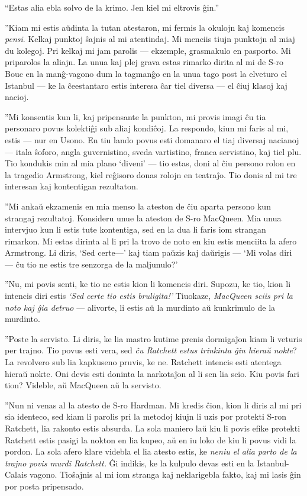 ``Estas alia ebla solvo de la krimo. Jen kiel mi eltrovis ĝin.''

''Kiam mi estis aŭdinta la tutan atestaron, mi fermis la okulojn kaj komencis \emph{pensi}. Kelkaj punktoj ŝajnis al mi atentindaj. Mi menciis tiujn punktojn al miaj du kolegoj. Pri kelkaj mi jam parolis --- ekzemple, grasmakulo en pasporto. Mi priparolos la aliajn. La unua kaj plej grava estas rimarko dirita al mi de S-ro Bouc en la manĝ-vagono dum la tagmanĝo en la unua tago post la elveturo el Istanbul --- ke la ĉeestantaro estis interesa ĉar tiel diversa --- el ĉiuj klasoj kaj nacioj.

''Mi konsentis kun li, kaj pripensante la punkton, mi provis imagi ĉu tia personaro povus kolektiĝi sub aliaj kondiĉoj. La respondo, kiun mi faris al mi, estis --- nur en Usono. En tiu lando povus esti domanaro el tiaj diversaj nacianoj --- itala ŝoforo, angla guvernistino, sveda vartistino, franca servistino, kaj tiel plu. Tio kondukis min al mia plano `diveni' --- tio estas, doni al ĉiu persono rolon en la tragedio Armstrong, kiel reĝisoro donas rolojn en teatraĵo. Tio donis al mi tre interesan kaj kontentigan rezultaton.

''Mi ankaŭ ekzamenis en mia menso la ateston de ĉiu aparta persono kun strangaj rezultatoj. Konsideru unue la ateston de S-ro MacQueen. Mia unua intervjuo kun li estis tute kontentiga, sed en la dua li faris iom strangan rimarkon. Mi estas dirinta al li pri la trovo de noto en kiu estis menciita la afero Armstrong. Li diris, `Sed certe---' kaj tiam paŭzis kaj daŭrigis --- `Mi volas diri --- ĉu tio ne estis tre senzorga de la maljunulo?'

''Nu, mi povis senti, ke tio ne estis kion li komencis diri. Supozu, ke tio, kion li intencis diri estis \emph{`Sed certe tio estis bruligita!'} Tiuokaze, \emph{MacQueen sciis pri la noto kaj ĝia detruo} --- alivorte, li estis aŭ la murdinto aŭ kunkrimulo de la murdinto.

''Poste la servisto. Li diris, ke lia mastro kutime prenis dormigaĵon kiam li veturis per trajno. Tio povus esti vera, sed \emph{ĉu Ratchett estus trinkinta ĝin hieraŭ nokte}? La revolvero sub lia kapkuseno pruvis, ke ne. Ratchett intencis esti atentega hieraŭ nokte. Oni devis esti doninta la narkotaĵon al li sen lia scio. Kiu povis fari tion? Videble, aŭ MacQueen aŭ la servisto.

''Nun ni venas al la atesto de S-ro Hardman. Mi kredis ĉion, kion li diris al mi pri sia identeco, sed kiam li parolis pri la metodoj kiujn li uzis por protekti S-ron Ratchett, lia rakonto estis absurda. La sola maniero laŭ kiu li povis efike protekti Ratchett estis pasigi la nokton en lia kupeo, aŭ en iu loko de kiu li povus vidi la pordon. La sola afero klare videbla el lia atesto estis, ke \emph{neniu el alia parto de la trajno povis murdi Ratchett.} Ĝi indikis, ke la kulpulo devas esti en la Istanbul-Calais vagono. Tioŝajnis al mi iom stranga kaj neklarigebla fakto, kaj mi lasis ĝin por posta pripensado.

